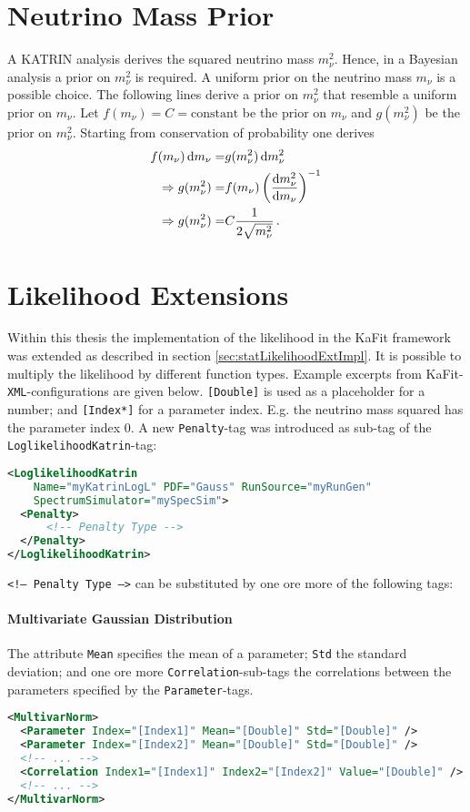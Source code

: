 \section{Neutrino Mass Prior}
\label{sec:appStatisticPriorOnNu2}
A KATRIN analysis derives the squared neutrino mass $m_\nu^2$. Hence, in a Bayesian analysis a prior on $m_\nu^2$ is required. A uniform prior on the neutrino mass $m_\nu$ is a possible choice. The following lines derive a prior on $m_\nu^2$ that resemble a uniform prior on $m_\nu$. Let $f(m_\nu)=C=\mathrm{constant}$ be the prior on $m_\nu$ and $g(m_\nu^2)$ be the prior on $m_\nu^2$. Starting from conservation of probability one derives
\begin{align*}
	f(m_\nu)\mathop{}\!\mathrm{d} m_\nu =& g(m_\nu^2) \mathop{}\!\mathrm{d} m_\nu^2 \\
	\Rightarrow
	g(m_\nu^2) =& f(m_\nu) \left( \frac{\mathop{}\!\mathrm{d} m_\nu^2}{\mathop{}\!\mathrm{d} m_\nu} \right)^{-1} \\
	\Rightarrow
	g(m_\nu^2) =& C \frac{1}{2\sqrt{m_\nu^2}}
	\text{\,.}
\end{align*}

\section{Likelihood Extensions}
\label{sec:statLikelihoodExtKaFitConfig}
Within this thesis the implementation of the likelihood in the KaFit framework was extended as described in section \ref{sec:statLikelihoodExtImpl}. It is possible to multiply the likelihood by different function types. Example excerpts from KaFit-\texttt{XML}-configurations are given below. {\color{brown}\texttt{[Double]}} is used as a placeholder for a number; and {\color{brown}\texttt{[Index*]}} for a parameter index. E.g. the neutrino mass squared has the parameter index 0. A new \texttt{Penalty}-tag was introduced as sub-tag of the \texttt{LoglikelihoodKatrin}-tag:
\begin{lstlisting}[language=XML]
<LoglikelihoodKatrin 
    Name="myKatrinLogL" PDF="Gauss" RunSource="myRunGen" 
    SpectrumSimulator="mySpecSim">
  <Penalty>
      <!-- Penalty Type -->
  </Penalty>
</LoglikelihoodKatrin>
\end{lstlisting}
{\color{gray}\texttt{<!-- Penalty Type -->}} can be substituted by one ore more of the following tags:
\paragraph{Multivariate Gaussian Distribution}
The attribute {\color{magenta}\texttt{Mean}} specifies the mean of a parameter; {\color{magenta}\texttt{Std}} the standard deviation; and one ore more {\color{violet}\texttt{Correlation}}-sub-tags the correlations between the parameters specified by the {\color{violet}\texttt{Parameter}}-tags.
\begin{lstlisting}[language=XML]
<MultivarNorm>
  <Parameter Index="[Index1]" Mean="[Double]" Std="[Double]" />
  <Parameter Index="[Index2]" Mean="[Double]" Std="[Double]" />
  <!-- ... -->
  <Correlation Index1="[Index1]" Index2="[Index2]" Value="[Double]" />
  <!-- ... -->
</MultivarNorm>
\end{lstlisting}

